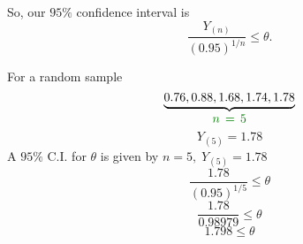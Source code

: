 \nl So, our $95\%$ confidence interval is
$$\frac{Y_{(n)}}{(0.95)^{1/n}} \leq \theta.$$

\example

\nl For a random sample
$$\underbrace{0.76, 0.88, 1.68, 1.74, 1.78}_{\textstyle \setGreen n\,=\, 5}$$
$$Y_{(5)} = 1.78$$
A $95\%$ C.I. for $\theta$ is given by $n=5, \; Y_{(5)} = 1.78$
$$\frac{1.78}{(0.95)^{1/5}} \leq \theta$$
$$\frac{1.78}{0.98979} \leq \theta$$
$$1.798 \leq \theta$$